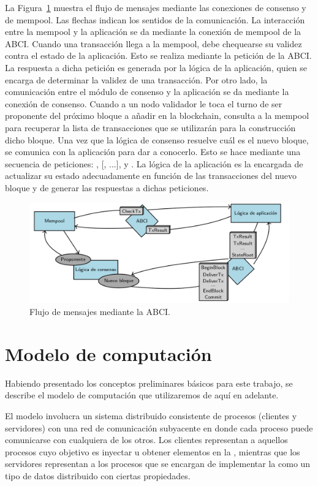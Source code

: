 La Figura~\ref{fig:abci_flow} muestra el flujo de mensajes mediante las conexiones de consenso y de mempool.
%
Las flechas indican los sentidos de la comunicación.
%
La interacción entre la mempool y la aplicación se da mediante la conexión de mempool de la ABCI.
%
Cuando una transacción llega a la mempool, debe chequearse su validez contra el estado de la aplicación.
%
Esto se realiza mediante la petición \CheckTx de la ABCI.
%
La respuesta a dicha petición es generada por la lógica de la aplicación, quien se encarga de determinar la
validez de una transacción.
%
Por otro lado, la comunicación entre el módulo de consenso y la aplicación se da mediante la conexión de consenso.
%
Cuando a un nodo validador le toca el turno de ser proponente del próximo bloque a añadir en la blockchain,
consulta a la mempool para recuperar la lista de transacciones que se utilizarán para la construcción dicho bloque.
%
Una vez que la lógica de consenso resuelve cuál es el nuevo bloque, se comunica con la aplicación para
dar a conocerlo.
%
Esto se hace mediante una secuencia de peticiones: \BeginBlock, [\DeliverTx, ...], \EndBlock y \Commit.
%
La lógica de la aplicación es la encargada de actualizar su estado adecuadamente en función de las transacciones del
nuevo bloque y de generar las respuestas a dichas peticiones.


\begin{figure}
  \centering
  \includegraphics[scale=0.35]{figures/abci_msg_flow.png}
  \caption{Flujo de mensajes mediante la ABCI.}
  \label{fig:abci_flow}
\end{figure}


\section{Modelo de computación}\label{sec:model_system}
Habiendo presentado los conceptos preliminares básicos para este trabajo, se describe
el modelo de computación que utilizaremos de aquí en adelante.

El modelo involucra un sistema distribuido consistente de procesos (clientes y servidores) con una
red de comunicación subyacente en donde cada proceso puede comunicarse con cualquiera de los otros.
Los clientes representan a aquellos procesos cuyo objetivo es inyectar u obtener elementos en la \setchain,
mientras que los servidores representan a los procesos que se encargan de implementar la \setchain
como un tipo de datos distribuido con ciertas propiedades.

